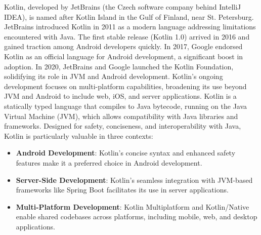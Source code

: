 Kotlin, developed by JetBrains (the Czech software company behind IntelliJ IDEA), is named after Kotlin Island in the Gulf of Finland, near St. Petersburg. JetBrains introduced Kotlin in 2011 as a modern language addressing limitations encountered with Java. The first stable release (Kotlin 1.0) arrived in 2016 and gained traction among Android developers quickly. In 2017, Google endorsed Kotlin as an official language for Android development, a significant boost in adoption. In 2020, JetBrains and Google launched the Kotlin Foundation, solidifying its role in JVM and Android development. Kotlin’s ongoing development focuses on multi-platform capabilities, broadening its use beyond JVM and Android to include web, iOS, and server applications. Kotlin is a statically typed language that compiles to Java bytecode, running on the Java Virtual Machine (JVM), which allows compatibility with Java libraries and frameworks. Designed for safety, conciseness, and interoperability with Java, Kotlin is particularly valuable in three contexts:

\begin{itemize}
    \item \textbf{Android Development}: Kotlin’s concise syntax and enhanced safety features make it a preferred choice in Android development.
    \item \textbf{Server-Side Development}: Kotlin’s seamless integration with JVM-based frameworks like Spring Boot facilitates its use in server applications.
    \item \textbf{Multi-Platform Development}: Kotlin Multiplatform and Kotlin/Native enable shared codebases across platforms, including mobile, web, and desktop applications.
\end{itemize}



